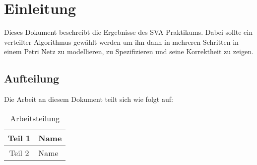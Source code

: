 \newpage
\section{Einleitung}
Dieses Dokument beschreibt die Ergebnisse des SVA Praktikums. Dabei sollte ein verteilter Algorithmus gewählt werden um ihn dann in mehreren Schritten in einem Petri Netz zu modellieren, zu Spezifizieren und seine Korrektheit zu zeigen.

\subsection{Aufteilung}
Die Arbeit an diesem Dokument teilt sich wie folgt auf:
\begin{table}[H]
\centering
\label{edmCats}
 \begin{tabular}{|c|l|}
 \hline
 	Teil 1 & Name\\
 \hline
	Teil 2 & Name\\
 \hline	
 \end{tabular}
\caption{Arbeitsteilung}
\end{table}